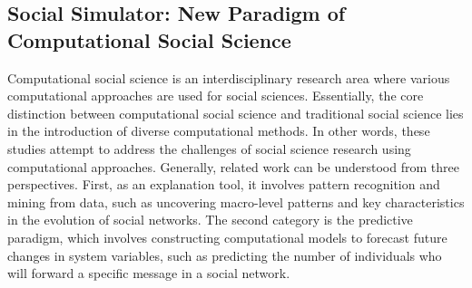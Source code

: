 \subsection{Social Simulator: New Paradigm of Computational Social Science}
Computational social science is an interdisciplinary research area where various computational approaches are used for social sciences. Essentially, the core distinction between computational social science and traditional social science lies in the introduction of diverse computational methods. In other words, these studies attempt to address the challenges of social science research using computational approaches. Generally, related work can be understood from three perspectives. First, as an explanation tool, it involves pattern recognition and mining from data, such as uncovering macro-level patterns and key characteristics in the evolution of social networks. The second category is the predictive paradigm, which involves constructing computational models to forecast future changes in system variables, such as predicting the number of individuals who will forward a specific message in a social network. 

